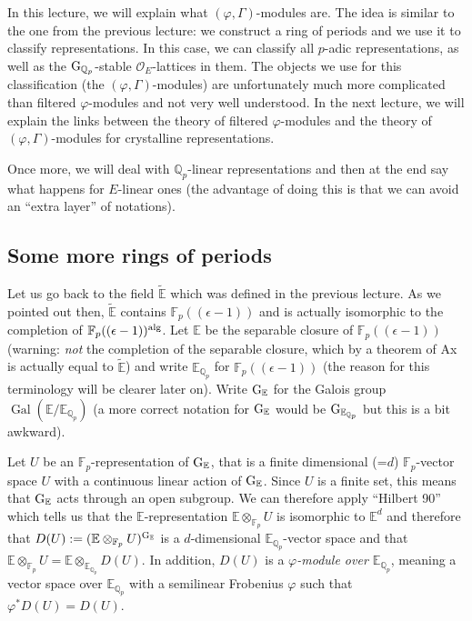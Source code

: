 \documentclass[11pt]{amsart}
\def\Q{{\mathbb Q}_p}
\def\F{{\mathbb F}_p}
\def\g{{\rm G}_{\Q}}
\def\O{{\mathcal O}_E}
\def\Qp{{\mathbb Q}_p}
\def\ee{\mathbb{E}}
\def\ge{{\rm G}_{\ee}}
\def\et{\widetilde{\mathbb{E}}}
\def\on{\operatorname}
\begin{document}
In this lecture, we will explain what $(\varphi,\Gamma)$-modules are. The 
idea is similar to the one from the previous lecture: we construct a 
ring of periods and we use it to classify representations. In this 
case, we can classify all $p$-adic representations, as well as the 
$\g$-stable $\O$-lattices in them. The objects we use for this 
classification (the $(\varphi,\Gamma)$-modules) are unfortunately much 
more complicated than filtered $\varphi$-modules and not very well 
understood. In the next lecture, we will explain the links between the 
theory of filtered $\varphi$-modules and the theory of 
$(\varphi,\Gamma)$-modules for crystalline representations. 
 
Once more, we will deal with $\Qp$-linear representations and then at 
the end say what happens for $E$-linear ones (the advantage of doing 
this is that we can avoid an ``extra layer'' of notations). 
 
\subsection{Some more rings of periods}\label{d(v)} 
Let us go back to the field $\et$ which was defined in the previous 
lecture. As we pointed out then, $\et$ contains $\F((\epsilon-1))$ and is 
actually isomorphic to the completion of $\F((\epsilon-1))^{\rm alg}$. Let 
$\ee$ be the separable closure of $\F((\epsilon-1))$ (warning: \emph{not} 
the completion of the separable closure, which by a theorem of Ax is 
actually equal to $\et$) and write $\ee_{\Q}$ for $\F((\epsilon-1))$ (the 
reason for this terminology will be clearer later on). Write $\ge$ for 
the Galois group $\on{Gal}(\ee/\ee_{\Q})$ (a more correct notation for 
$\ge$ would be ${\rm G}_{\ee_{\Q}}$ but this is a bit awkward). 
 
Let $U$ be an $\F$-representation of $\ge$, that is a finite 
dimensional (=$d$)  
$\F$-vector space $U$ with a continuous linear action of 
$\ge$. Since $U$ is a finite set, this means that $\ge$ acts through 
an open subgroup. We can therefore apply ``Hilbert 90'' which tells us 
that the $\ee$-representation $\ee \otimes_{\F} U$ is isomorphic to 
$\ee^d$ and therefore that 
$D(U):=(\ee \otimes_{\F} U)^{\ge}$ is a $d$-dimensional  
$\ee_{\Q}$-vector space and that $\ee \otimes_{\F} U = \ee 
\otimes_{\ee_{\Q}} D(U)$.  
In addition, $D(U)$ is a \emph{$\varphi$-module over $\ee_{\Q}$}, meaning 
a vector space over $\ee_{\Q}$ with a semilinear Frobenius $\varphi$ such 
that $\varphi^* D(U) = D(U)$. 
  
\end{document}
